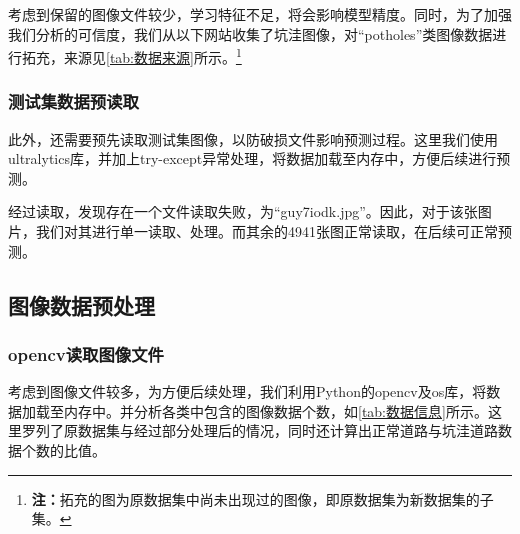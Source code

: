 \documentclass{MathorCupmodeling}
\begin{document}
	考虑到保留的图像文件较少，学习特征不足，将会影响模型精度。同时，为了加强我们分析的可信度，我们从以下网站收集了坑洼图像，对“potholes”类图像数据进行拓充，来源见\textcolor{blue}{\cref{tab:数据来源}}所示。\textcolor{blue}{\footnote{\textbf{注：}拓充的图为原数据集中尚未出现过的图像，即原数据集为新数据集的子集。}}
	\begin{table}[htbp]
		\centering
		\caption{拓充数据来源}
		\label{tab:数据来源}
	  \end{table}
	\subsubsection{测试集数据预读取}
	此外，还需要预先读取测试集图像，以防破损文件影响预测过程。这里我们使用ultralytics库，并加上try-except异常处理，将数据加载至内存中，方便后续进行预测。
	
	经过读取，发现存在一个文件读取失败，为“guy7iodk.jpg”。因此，对于该张图片，我们对其进行单一读取、处理。而其余的4941张图正常读取，在后续可正常预测。
	\subsection{图像数据预处理}
	\subsubsection{opencv读取图像文件}
	考虑到图像文件较多，为方便后续处理，我们利用Python的opencv及os库，将数据加载至内存中。并分析各类中包含的图像数据个数，如\textcolor{blue}{\cref{tab:数据信息}}所示。这里罗列了原数据集与经过\textcolor{blue}{}部分处理后的情况，同时还计算出正常道路与坑洼道路数据个数的比值。

\begin{table}[H]
	\centering
	\caption{数据信息}
	\label{tab:数据信息}
\end{table}
	
\end{document}
